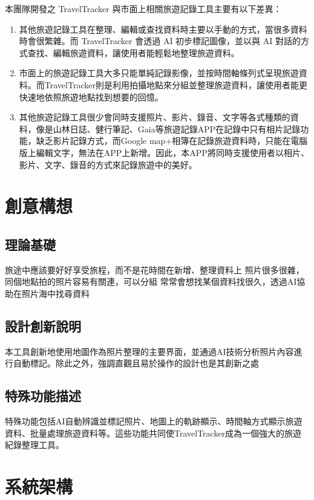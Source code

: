 \documentclass[12pt]{article}
\begin{document}
本團隊開發之 TravelTracker 與市面上相關旅遊記錄工具主要有以下差異：

\begin{enumerate}
    \item 其他旅遊記錄工具在整理、編輯或查找資料時主要以手動的方式，當很多資料時會很繁雜。而 TravelTracker 會透過 AI 初步標記圖像，並以與 AI 對話的方式查找、編輯旅遊資料，讓使用者能輕鬆地整理旅遊資料。
    \item 市面上的旅遊記錄工具大多只能單純記錄影像，並按時間軸條列式呈現旅遊資料。而TravelTracker則是利用拍攝地點來分組並整理旅遊資料，讓使用者能更快速地依照旅遊地點找到想要的回憶。
    \item 其他旅遊記錄工具很少會同時支援照片、影片、錄音、文字等各式種類的資料，像是山林日誌、健行筆記、Gaia等旅遊記錄APP在記錄中只有相片記錄功能，缺乏影片記錄方式，而Google map+相簿在記錄旅遊資料時，只能在電腦版上編輯文字，無法在APP上新增。因此，本APP將同時支援使用者以相片、影片、文字、錄音的方式來記錄旅遊中的美好。
\end{enumerate}

\section{創意構想}

\subsection{理論基礎}

旅途中應該要好好享受旅程，而不是花時間在新增、整理資料上
照片很多很雜，同個地點拍的照片容易有關連，可以分組
常常會想找某個資料找很久，透過AI協助在照片海中找尋資料

\subsection{設計創新說明}

本工具創新地使用地圖作為照片整理的主要界面，並通過AI技術分析照片內容進行自動標記。除此之外，強調直觀且易於操作的設計也是其創新之處

\subsection{特殊功能描述}

特殊功能包括AI自動辨識並標記照片、地圖上的軌跡顯示、時間軸方式顯示旅遊資料、批量處理旅遊資料等。這些功能共同使TravelTracker成為一個強大的旅遊紀錄整理工具。

\section{系統架構}
\end{document}
